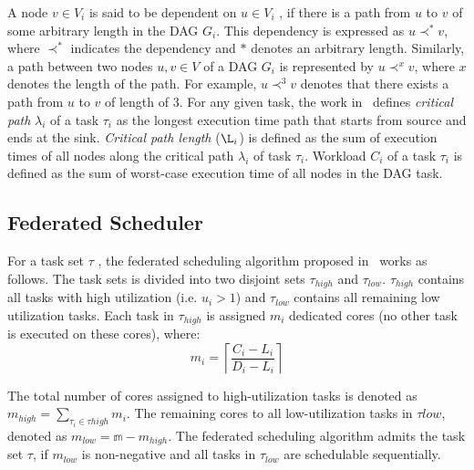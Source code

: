 
A node $v \in V_i$ is said to be dependent on $u \in V_i$ , if there is a path from $u$ to $v$ of some arbitrary length in the DAG $G_i$. This dependency is expressed as \textbf{${u \prec^* v}$}, where $\prec^*$ indicates the dependency and $*$ denotes an arbitrary length. Similarly, a path between two nodes $u, v \in V$ of a DAG $G_i$ is represented by $u \prec^{x} v$, where $x$ denotes the length of the path. For example, $u \prec^{3} v$ denotes that there exists a path from $u$ to $v$ of length of 3.
For any given task, the work in~\cite{li2014analysis} defines \textit{critical path} $\lambda_i$ of a 
task $\tau_i$ as the longest execution time path that starts from
source and ends at the sink. \textit{Critical path length} ($\L_i$) is
defined as the sum of execution times of all nodes along the critical
path $\lambda_i$ of task $\tau_{i}$.  Workload $C_{i}$ of
a task $\tau_{i}$ is defined as the sum of worst-case execution time of
all nodes in the DAG task. 

\subsection{Federated Scheduler}
For a task set $\tau$ , the federated scheduling algorithm proposed in~\cite{li2014analysis} works as
follows. The task sets is divided into two disjoint sets
$\tau_{high}$  and $\tau_{low}$. $\tau_{high}$ contains all tasks with
high utilization (i.e. $u_i > 1$) and $\tau_{low}$ contains all
remaining low utilization tasks. Each task in $\tau_{high}$ is
assigned $m_{i}$ dedicated cores (no other task is executed on these
cores), where: \begin{equation}\label{eq:m} m_{i} = \left\lceil \frac{C_{i} - L_{i}}{D_{i} - L_{i}}
\right\rceil \end{equation}

\noindent The total
number of cores assigned to high-utilization tasks is denoted as $m_{high} = \sum_{\tau_{i} \in \tau{high}} m_{i}$. 
The remaining cores to all low-utilization tasks in $\tau{low}$, denoted
as ${m_{low} =  \mathbb{m} - m_{high}}$. The federated scheduling algorithm admits
the task set ${\tau}$, if $m_{low}$ is non-negative and all tasks in
$\tau_{low}$ are schedulable sequentially.  

